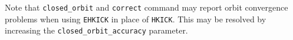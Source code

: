 Note that \verb|closed_orbit| and \verb|correct| command may report orbit convergence problems 
when using \verb|EHKICK| in place of \verb|HKICK|. This may be resolved by increasing the
\verb|closed_orbit_accuracy| parameter.
